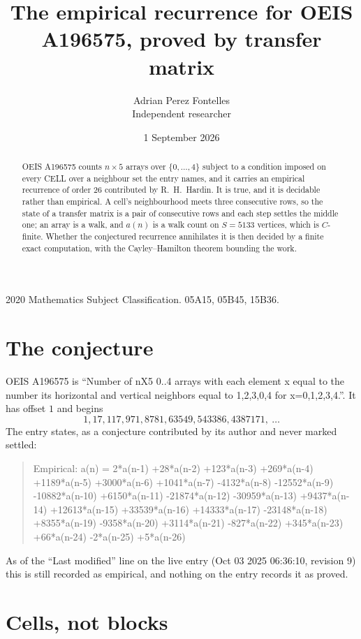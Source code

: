 \documentclass[11pt,a4paper]{article}
\title{The empirical recurrence for OEIS A196575, proved by transfer matrix}
\author{Adrian Perez Fontelles\\ \small Independent researcher}
\date{1 September 2026}
\theoremstyle{plain}
\theoremstyle{definition}
\begin{document}
\maketitle

\begin{abstract}
OEIS A196575 counts $n\times5$ arrays over $\{0,\dots,4\}$ subject to a condition imposed on
every CELL over a neighbour set the entry names, and it carries an empirical recurrence of
order $26$ contributed by R.~H.~Hardin. It is true, and it is decidable rather than
empirical. A cell's neighbourhood meets three consecutive rows, so the state of a transfer
matrix is a pair of consecutive rows and each step settles the middle one; an array is a
walk, and $a(n)$ is a walk count on $S=5133$ vertices, which is $C$-finite. Whether the
conjectured recurrence annihilates it is then decided by a finite exact computation, with the
Cayley--Hamilton theorem bounding the work.
\end{abstract}

\noindent\small 2020 Mathematics Subject Classification. 05A15, 05B45, 15B36.\normalsize

\section{The conjecture}

OEIS A196575 is ``Number of nX5 0..4 arrays with each element x equal to the number its horizontal and vertical neighbors equal to 1,2,3,0,4 for x=0,1,2,3,4.''. It has offset $1$ and begins
\[
1, 17, 117, 971, 8781, 63549, 543386, 4387171,\ \dots
\]
The entry states, as a conjecture contributed by its author and never marked settled:
\begin{quote}
Empirical: a(n) = 2*a(n-1) +28*a(n-2) +123*a(n-3) +269*a(n-4) +1189*a(n-5) +3000*a(n-6) +1041*a(n-7) -4132*a(n-8) -12552*a(n-9) -10882*a(n-10) +6150*a(n-11) -21874*a(n-12) -30959*a(n-13) +9437*a(n-14) +12613*a(n-15) +33539*a(n-16) +14333*a(n-17) -23148*a(n-18) +8355*a(n-19) -9358*a(n-20) +3114*a(n-21) -827*a(n-22) +345*a(n-23) +66*a(n-24) -2*a(n-25) +5*a(n-26)
\end{quote}
As of the ``Last modified'' line on the live entry (Oct 03 2025 06:36:10, revision 9) this is still
recorded as empirical, and nothing on the entry records it as proved.

\section{Cells, not blocks}
\end{document}
